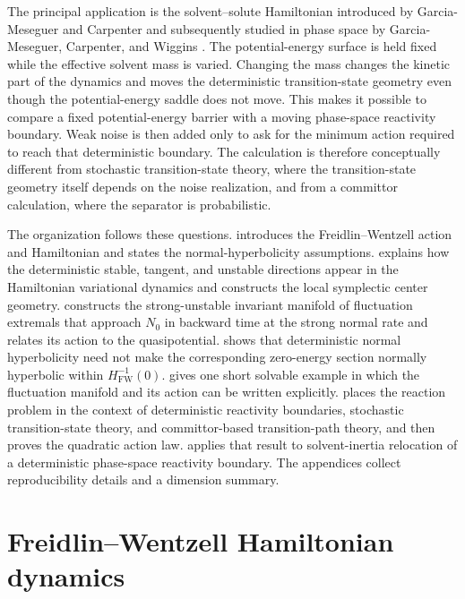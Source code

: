 \documentclass[11pt]{article}
\theoremstyle{definition}
\theoremstyle{remark}
\begin{document}
The principal application is the solvent--solute Hamiltonian introduced by Garcia-Meseguer and Carpenter and subsequently studied in phase space by Garcia-Meseguer, Carpenter, and Wiggins \cite{GarciaMeseguerCarpenter2019,GarciaMeseguerCarpenterWiggins2019}.  The potential-energy surface is held fixed while the effective solvent mass is varied.  Changing the mass changes the kinetic part of the dynamics and moves the deterministic transition-state geometry even though the potential-energy saddle does not move.  This makes it possible to compare a fixed potential-energy barrier with a moving phase-space reactivity boundary.  Weak noise is then added only to ask for the minimum action required to reach that deterministic boundary.  The calculation is therefore conceptually different from stochastic transition-state theory, where the transition-state geometry itself depends on the noise realization, and from a committor calculation, where the separator is probabilistic.

The organization follows these questions.   introduces the Freidlin--Wentzell action and Hamiltonian and states the normal-hyperbolicity assumptions.   explains how the deterministic stable, tangent, and unstable directions appear in the Hamiltonian variational dynamics and constructs the local symplectic center geometry.   constructs the strong-unstable invariant manifold of fluctuation extremals that approach $N_0$ in backward time at the strong normal rate and relates its action to the quasipotential.   shows that deterministic normal hyperbolicity need not make the corresponding zero-energy section normally hyperbolic within $H_{\mathrm{FW}}^{-1}(0)$.   gives one short solvable example in which the fluctuation manifold and its action can be written explicitly.   places the reaction problem in the context of deterministic reactivity boundaries, stochastic transition-state theory, and committor-based transition-path theory, and then proves the quadratic action law.   applies that result to solvent-inertia relocation of a deterministic phase-space reactivity boundary.  The appendices collect reproducibility details and a dimension summary.

\section{Freidlin--Wentzell Hamiltonian dynamics}
\label{sec:fw}
\end{document}
